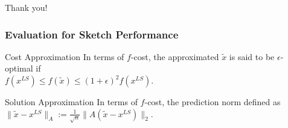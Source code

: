 \documentclass{beamer}
\begin{document}
\begin{frame}
    \begin{center}
        \Large Thank you!
    \end{center}
\end{frame}

\begin{frame}
    \frametitle{Evaluation for Sketch Performance}
    \begin{block}{Cost Approximation}
        In terms of $f$-cost, the approximated $\tilde{x}$ is said to be $\epsilon$-optimal if \\
        \vspace{.5cm}
        $f(x^{LS}) \leq f(\tilde{x}) \leq (1+\epsilon)^2 f(x^{LS})$.
    \end{block}
    
    \begin{block}{Solution Approximation}
        In terms of $f$-cost, the prediction norm defined as \\
        \vspace{.5cm}
        $\|\tilde{x} - x^{LS}\|_A := \frac{1}{\sqrt{n}} \|A(\tilde{x} - x^{LS})\|_2$.
    \end{block}
\end{frame}
\end{document}
